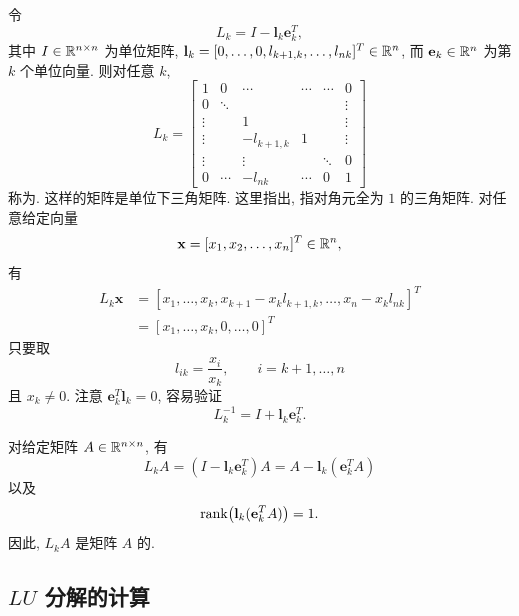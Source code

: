 令
\[
  L_k=I-\mathbf{l}_k\mathbf{e}_k^T,
\]
其中 $I\in\mathbb{R}^{n\times n}$ 为单位矩阵, $\mathbf{l}_k=[0,\ldots,0,l_{k+1,k},\ldots,l_{nk}]^T\in\mathbb{R}^n$, 而 $\mathbf{e}_k\in\mathbb{R}^n$ 为第 $k$ 个单位向量. 则对任意 $k$,
\[
  L_k=
  \begin{bmatrix}
    1      & 0      & \cdots & \cdots & \cdots & 0 \\
    0      & \ddots &        &        &        & \vdots \\
    \vdots &        & 1      &        &        & \vdots \\
    \vdots &        & -l_{k+1,k} & 1  &        & \vdots \\
    \vdots &        & \vdots &        & \ddots & 0 \\
    0      & \cdots & -l_{nk}& \cdots & 0      & 1
  \end{bmatrix}
\]
称为. 这样的矩阵是单位下三角矩阵. 这里指出, 指对角元全为 $1$ 的三角矩阵. 对任意给定向量
\[
  \mathbf{x}=[x_1,x_2,\ldots,x_n]^T\in\mathbb{R}^n,
\]
有
\[
  \begin{aligned}
    L_k\mathbf{x}
    &=[x_1,\ldots,x_k,x_{k+1}-x_kl_{k+1,k},\ldots,x_n-x_kl_{nk}]^T\\
    &=[x_1,\ldots,x_k,0,\ldots,0]^T
  \end{aligned}
\]
只要取
\[
  l_{ik}=\frac{x_i}{x_k},\qquad i=k+1,\ldots,n
\]
且 $x_k\neq0$. 注意 $\mathbf{e}_k^T\mathbf{l}_k=0$, 容易验证
\[
  L_k^{-1}=I+\mathbf{l}_k\mathbf{e}_k^T.
\]

对给定矩阵 $A\in\mathbb{R}^{n\times n}$, 有
\[
  L_kA=(I-\mathbf{l}_k\mathbf{e}_k^T)A=A-\mathbf{l}_k(\mathbf{e}_k^TA)
\]
以及
\[
  \operatorname{rank}\bigl(\mathbf{l}_k(\mathbf{e}_k^TA)\bigr)=1.
\]
因此, $L_kA$ 是矩阵 $A$ 的.

\subsection{$LU$ 分解的计算}

